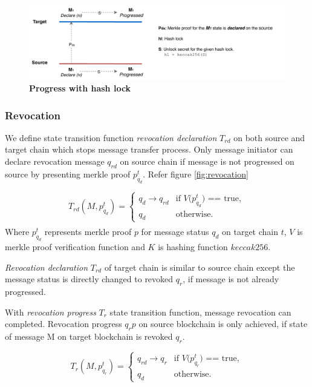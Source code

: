 \documentclass[12pt,a4paper]{article}
\begin{document}
\begin{figure}[htb]
    \centering
	\includegraphics[width=\textwidth]{progress_with_hashlock}
	\caption{\textbf{Progress with hash lock}}
	\label{fig:progress_with_hashlock}
\end{figure}
\subsubsection{Revocation}\label{gateway:revocation}

We define state transition function \emph{revocation declaration} $T_{rd}$ on both source and target chain which stops message transfer process. 
Only message initiator can declare revocation message $q_{rd}$  on source chain if message is not progressed on source by presenting merkle proof $p^t_{q_d}$.
 Refer figure \ref{fig:revocation}

\begin{equation*}
T_{rd}(M,p^t_{q_d})=\begin{cases}
q_d \rightarrow q_{rd} & \text{if $V$($p^t_{q_d}$) == true},\\
q_d& \text{otherwise}.
\end{cases}
\end{equation*}
\begin{align*}
\end{align*}
Where $p^t_{q_d}$ represents merkle proof $p$ for message status $q_d$ on target chain $t$, $V$ is merkle proof verification function and $K$ is hashing function $keccak256$.

\emph{Revocation declaration} $T_{rd}$ of target chain is similar to source chain except the message status is directly changed to revoked $q_r$, if message is not already progressed.

With \emph{revocation progress} $T_r$ state transition function,  message revocation can completed. Revocation progress $q_rp$ on source blockchain is only achieved, if state of message M on target blockchain is revoked $q_r$.

\begin{equation*}
T_{r}(M,p^t_{q_r})=\begin{cases}
q_{rd} \rightarrow q_r & \text{if $V$($p^t_{q_r}$) == true},\\
q_d& \text{otherwise}.
\end{cases}
\end{equation*}
\begin{align*}
\end{align*}
\end{document}
